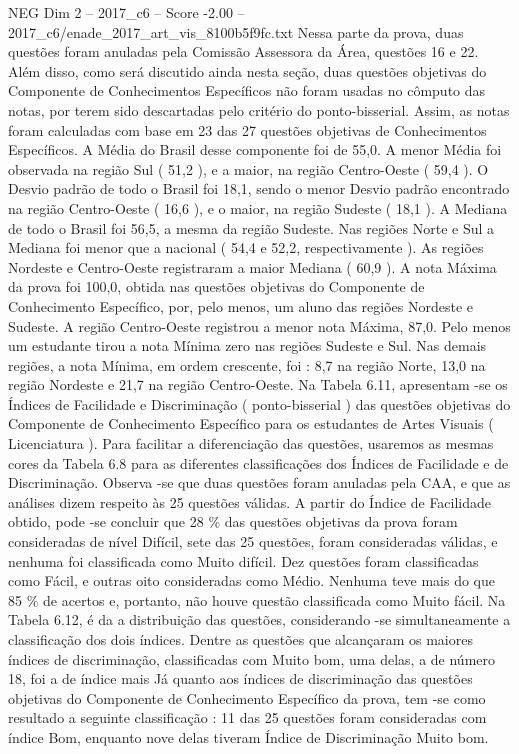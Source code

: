 \begin{textsample}{NEG Dim 2 – 2017\_c6 – Score -2.00 – 2017\_c6/enade\_2017\_art\_vis\_8100b5f9fc.txt}
Nessa parte da prova, duas questões foram anuladas pela Comissão Assessora da Área, questões 16 e 22.
Além disso, como será discutido ainda nesta seção, duas questões objetivas do Componente de Conhecimentos Específicos não foram usadas no cômputo das notas, por terem sido descartadas pelo critério do ponto-bisserial.
Assim, as notas foram calculadas com base em 23 das 27 questões objetivas de Conhecimentos Específicos.
A Média do Brasil desse componente foi de 55,0.
A menor Média foi observada na região Sul ( 51,2 ), e a maior, na região Centro-Oeste ( 59,4 ).
O Desvio padrão de todo o Brasil foi 18,1, sendo o menor Desvio padrão encontrado na região Centro-Oeste ( 16,6 ), e o maior, na região Sudeste ( 18,1 ).
A Mediana de todo o Brasil foi 56,5, a mesma da região Sudeste.
Nas regiões Norte e Sul a Mediana foi menor que a nacional ( 54,4 e 52,2, respectivamente ).
As regiões Nordeste e Centro-Oeste registraram a maior Mediana ( 60,9 ).
A nota Máxima da prova foi 100,0, obtida nas questões objetivas do Componente de Conhecimento Específico, por, pelo menos, um aluno das regiões Nordeste e Sudeste.
A região Centro-Oeste registrou a menor nota Máxima, 87,0.
Pelo menos um estudante tirou a nota Mínima zero nas regiões Sudeste e Sul.
Nas demais regiões, a nota Mínima, em ordem crescente, foi : 8,7 na região Norte, 13,0 na região Nordeste e 21,7 na região Centro-Oeste.
Na Tabela 6.11, apresentam -se os Índices de Facilidade e Discriminação ( ponto-bisserial ) das questões objetivas do Componente de Conhecimento Específico para os estudantes de Artes Visuais ( Licenciatura ).
Para facilitar a diferenciação das questões, usaremos as mesmas cores da Tabela 6.8 para as diferentes classificações dos Índices de Facilidade e de Discriminação.
Observa -se que duas questões foram anuladas pela CAA, e que as análises dizem respeito às 25 questões válidas.
A partir do Índice de Facilidade obtido, pode -se concluir que 28 \% das questões objetivas da prova foram consideradas de nível Difícil, sete das 25 questões, foram consideradas válidas, e nenhuma foi classificada como Muito difícil.
Dez questões foram classificadas como Fácil, e outras oito consideradas como Médio.
Nenhuma teve mais do que 85 \% de acertos e, portanto, não houve questão classificada como Muito fácil.
Na Tabela 6.12, é da a distribuição das questões, considerando -se simultaneamente a classificação dos dois índices.
Dentre as questões que alcançaram os maiores índices de discriminação, classificadas com Muito bom, uma delas, a de número 18, foi a de índice mais Já quanto aos índices de discriminação das questões objetivas do Componente de Conhecimento Específico da prova, tem -se como resultado a seguinte classificação : 11 das 25 questões foram consideradas com índice Bom, enquanto nove delas tiveram Índice de Discriminação Muito bom.

\end{textsample}
